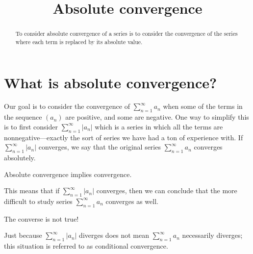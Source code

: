 \documentclass{ximera}
\title{Absolute convergence}
\begin{document}
\begin{abstract}
  To consider absolute convergence of a series is to consider the convergence of the series where each term is replaced by its absolute value.
\end{abstract}

\maketitle

\section{What is absolute convergence?}

Our goal is to consider the convergence of \(\sum_{n=1}^\infty a_n\) when some of the terms in the sequence \((a_n)\) are positive, and some are negative.  One way to simplify this is to first consider \(\sum_{n=1}^\infty |a_n|\) which is a series in which all the terms are nonnegative---exactly the sort of series we have had a ton of experience with.  If \(\sum_{n=1}^\infty |a_n|\) converges, we say that the original series \(\sum_{n=1}^\infty a_n\) converges absolutely.


\begin{theorem}
Absolute convergence implies convergence.
\end{theorem}
This means that if \(\sum_{n=1}^\infty |a_n|\) converges, then we can conclude that the more difficult to study series \(\sum_{n=1}^\infty a_n\) converges as well. 


\begin{warning}
The converse is not true!
\end{warning}

Just because \(\sum_{n=1}^\infty |a_n|\) diverges does not mean \(\sum_{n=1}^\infty a_n\) necessarily diverges; this situation is referred to as conditional convergence.

\end{document}
